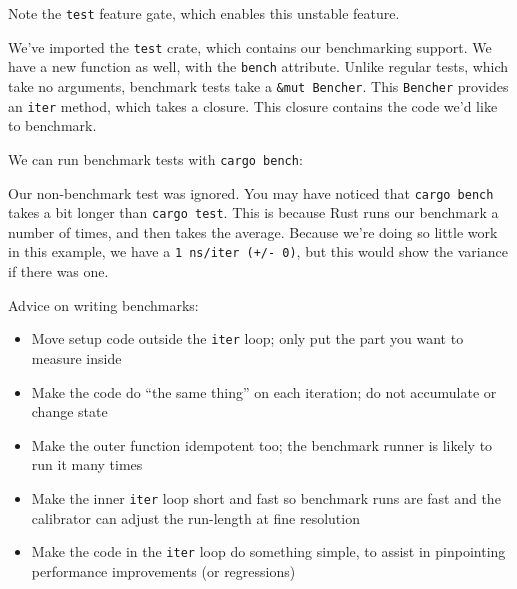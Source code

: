 \documentclass[a4paper,]{book}
\newenvironment{Shaded}{\begin{snugshade}}{\end{snugshade}}
\newcommand{\KeywordTok}[1]{\textcolor[rgb]{0.13,0.29,0.53}{\textbf{{#1}}}}
\newcommand{\NormalTok}[1]{{#1}}
\providecommand{\tightlist}{%
  \setlength{\itemsep}{0pt}\setlength{\parskip}{0pt}}
\begin{document}
Note the \texttt{test} feature gate, which enables this unstable
feature.

We've imported the \texttt{test} crate, which contains our benchmarking
support. We have a new function as well, with the \texttt{bench}
attribute. Unlike regular tests, which take no arguments, benchmark
tests take a \texttt{\&mut\ Bencher}. This \texttt{Bencher} provides an
\texttt{iter} method, which takes a closure. This closure contains the
code we'd like to benchmark.

We can run benchmark tests with \texttt{cargo\ bench}:

\begin{Shaded}
\end{Shaded}

Our non-benchmark test was ignored. You may have noticed that
\texttt{cargo\ bench} takes a bit longer than \texttt{cargo\ test}. This
is because Rust runs our benchmark a number of times, and then takes the
average. Because we're doing so little work in this example, we have a
\texttt{1\ ns/iter\ (+/-\ 0)}, but this would show the variance if there
was one.

Advice on writing benchmarks:

\begin{itemize}
\tightlist
\item
  Move setup code outside the \texttt{iter} loop; only put the part you
  want to measure inside
\item
  Make the code do ``the same thing'' on each iteration; do not
  accumulate or change state
\item
  Make the outer function idempotent too; the benchmark runner is likely
  to run it many times
\item
  Make the inner \texttt{iter} loop short and fast so benchmark runs are
  fast and the calibrator can adjust the run-length at fine resolution
\item
  Make the code in the \texttt{iter} loop do something simple, to assist
  in pinpointing performance improvements (or regressions)
\end{itemize}
\end{document}
